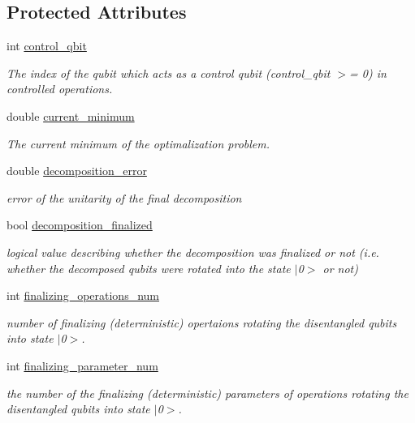\subsection*{Protected Attributes}
\begin{DoxyCompactItemize}
\item 
int \hyperlink{class_operation_a9a798ea8adec5a45fd2ca07996da88e1}{control\+\_\+qbit}
\begin{DoxyCompactList}\small\item\em The index of the qubit which acts as a control qubit (control\+\_\+qbit $>$= 0) in controlled operations. \end{DoxyCompactList}\item 
double \hyperlink{class_decomposition___base_a7a8a6050c20f7965286792493a55d877}{current\+\_\+minimum}
\begin{DoxyCompactList}\small\item\em The current minimum of the optimalization problem. \end{DoxyCompactList}\item 
double \hyperlink{class_decomposition___base_a9b181a78ecfd103c9b233ddafa2defdd}{decomposition\+\_\+error}
\begin{DoxyCompactList}\small\item\em error of the unitarity of the final decomposition \end{DoxyCompactList}\item 
bool \hyperlink{class_decomposition___base_a488bfdaecfefa4fb9fb3149657b40b6d}{decomposition\+\_\+finalized}
\begin{DoxyCompactList}\small\item\em logical value describing whether the decomposition was finalized or not (i.\+e. whether the decomposed qubits were rotated into the state $\vert$0$>$ or not) \end{DoxyCompactList}\item 
int \hyperlink{class_decomposition___base_a0685291401fc40fee1121eddba63a429}{finalizing\+\_\+operations\+\_\+num}
\begin{DoxyCompactList}\small\item\em number of finalizing (deterministic) opertaions rotating the disentangled qubits into state $\vert$0$>$. \end{DoxyCompactList}\item 
int \hyperlink{class_decomposition___base_ae83ca982ee7da29119245860d212864c}{finalizing\+\_\+parameter\+\_\+num}
\begin{DoxyCompactList}\small\item\em the number of the finalizing (deterministic) parameters of operations rotating the disentangled qubits into state $\vert$0$>$. \end{DoxyCompactList}\item 

\end{DoxyCompactItemize}
